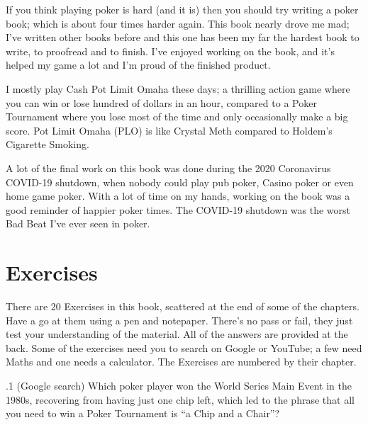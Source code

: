 If you think playing poker is hard (and it is) then you should try
writing a poker book; which is about four times harder again. This book
nearly drove me mad; I've written other books before and this one has
been my far the hardest book to write, to proofread and to
finish. I've enjoyed working on the book, and it's helped my game a
lot and I'm proud of the finished product.

I mostly play Cash Pot Limit Omaha these days; a thrilling action game
where you can win or lose hundred of dollars in an hour, compared to a
Poker Tournament where you lose most of the time and only occasionally
make a big score. Pot Limit Omaha (PLO) is like Crystal Meth compared
to Holdem's Cigarette Smoking.

A lot of the final work on this book was done during the 2020
Coronavirus COVID-19 shutdown, when nobody could play pub poker,
Casino poker or even home game poker. With a lot of time on my hands,
working on the book was a good reminder of happier poker times. The
COVID-19 shutdown was the worst Bad Beat I've ever seen in poker.


\section*{Exercises}


There are 20 Exercises in this book, scattered at the end of some of
the chapters. Have a go at them using a pen and notepaper. There's no
pass or fail, they just test your understanding of the material. All
of the answers are provided at the back. Some of the exercises need
you to search on Google or YouTube; a few need Maths and one needs a
calculator. The Exercises are numbered by their chapter.

.1 (Google search) Which poker player won the World
Series Main Event in the 1980s, recovering from having just one chip
left, which led to the phrase that all you need to win a Poker
Tournament is ``a Chip and a Chair''?
